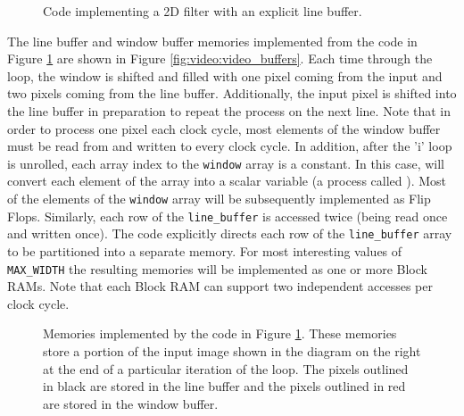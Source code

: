 \begin{figure}

\caption{Code implementing a 2D filter with an explicit line buffer.}\label{fig:video:2Dfilter_linebuffer}
\end{figure}

The line buffer and window buffer memories implemented from the code in Figure \ref{fig:video:2Dfilter_linebuffer} are shown in Figure \ref{fig:video:video_buffers}.    Each time through the loop, the window is shifted and filled with one pixel coming from the input and two pixels coming from the line buffer.  Additionally, the input pixel is shifted into the line buffer in preparation to repeat the process on the next line.  Note that in order to process one pixel each clock cycle, most elements of the window buffer must be read from and written to every clock cycle. In addition, after the 'i' loop is unrolled, each array index to the \lstinline|window| array is a constant.  In this case, \VHLS will convert each element of the array into a scalar variable (a process called ).  Most of the elements of the \lstinline|window| array will be subsequently implemented as Flip Flops.  Similarly, each row of the \lstinline|line_buffer| is accessed twice (being read once and written once).  The code explicitly directs each row of the \lstinline|line_buffer| array to be partitioned into a separate memory.  For most interesting values of \lstinline|MAX_WIDTH| the resulting memories will be implemented as one or more Block RAMs.  Note that each Block RAM can support two independent accesses per clock cycle.

\begin{figure}
\centering

\caption{ Memories implemented by the code in Figure \ref{fig:video:2Dfilter_linebuffer}.  These memories store a portion of the input image shown in the diagram on the right at the end of a particular iteration of the loop.  The pixels outlined in black are stored in the line buffer and the pixels outlined in red are stored in the window buffer.}\label{fig:video:video_buffers}
\label{fig:dft-visualization}
\end{figure}


